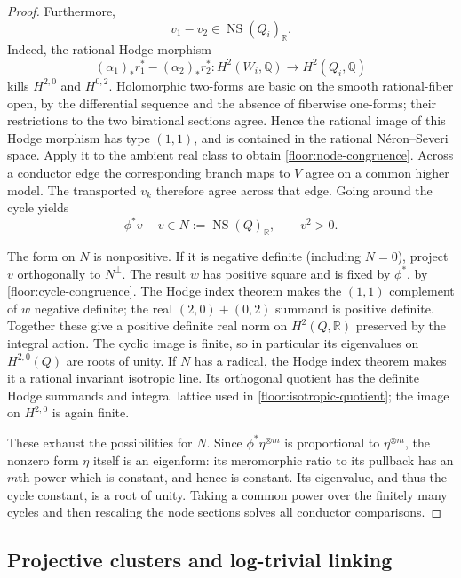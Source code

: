 \documentclass[11pt,letterpaper]{article}
\newcommand{\Q}{\mathbb{Q}}
\newcommand{\R}{\mathbb{R}}
\DeclareMathOperator{\NS}{NS}
\theoremstyle{definition}
\theoremstyle{remark}
\begin{document}
\begin{proof}
Furthermore,
\begin{equation}
 \label{floor:node-congruence}
 v_1-v_2\in\NS(Q_i)_\R.
\end{equation}
Indeed, the rational Hodge morphism
\[
 (\alpha_1)_*r_1^*-(\alpha_2)_*r_2^*
 :H^2(W_i,\Q)\longrightarrow H^2(Q_i,\Q)
\]
kills $H^{2,0}$ and $H^{0,2}$.  Holomorphic two-forms are
basic on the smooth rational-fiber open, by the differential
sequence and the absence of fiberwise one-forms; their
restrictions to the two birational sections agree.  Hence
the rational image of this Hodge morphism has type $(1,1)$,
and is contained in the rational N\'eron--Severi space.
Apply it to the ambient real class to obtain
\eqref{floor:node-congruence}.  Across a conductor edge the
corresponding branch maps to $V$ agree on a common higher
model.  The transported $v_k$ therefore agree across that
edge.  Going around the cycle yields
\begin{equation}
 \label{floor:cycle-congruence}
 \phi^*v-v\in N:=\NS(Q)_\R,\qquad v^2>0.
\end{equation}

The form on $N$ is nonpositive.  If it is negative definite
(including $N=0$), project $v$ orthogonally to $N^\perp$.
The result $w$ has positive square and is fixed by $\phi^*$,
by \eqref{floor:cycle-congruence}.  The Hodge index theorem
makes the $(1,1)$ complement of $w$ negative definite;
the real $(2,0)+(0,2)$ summand is positive definite.
Together these give a positive definite real norm on
$H^2(Q,\R)$ preserved by the integral action.  The cyclic
image is finite, so in particular its eigenvalues on
$H^{2,0}(Q)$ are roots of unity.  If $N$ has a radical,
the Hodge index theorem makes it a rational invariant
isotropic line.  Its orthogonal quotient has the definite
Hodge summands and integral lattice used in
\eqref{floor:isotropic-quotient}; the image on $H^{2,0}$
is again finite.

These exhaust the possibilities for $N$.  Since
$\phi^*\eta^{\otimes m}$ is proportional to
$\eta^{\otimes m}$, the nonzero form $\eta$ itself is an
eigenform: its meromorphic ratio to its pullback has an
$m$th power which is constant, and hence is constant.
Its eigenvalue, and thus the cycle constant, is a root of
unity.  Taking a common power over the finitely many
cycles and then rescaling the node sections solves all
conductor comparisons.
\end{proof}

\subsection{Projective clusters and log-trivial linking}
\end{document}
